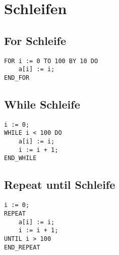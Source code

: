 


\section{Schleifen}
\subsection{For Schleife}
\begin{lstlisting}
FOR i := 0 TO 100 BY 10 DO
    a[i] := i;
END_FOR
\end{lstlisting}

\subsection{While Schleife}
\begin{lstlisting}
i := 0;
WHILE i < 100 DO
    a[i] := i;
    i := i + 1;
END_WHILE
\end{lstlisting}

\subsection{Repeat until Schleife}
\begin{lstlisting}
i := 0;
REPEAT
    a[i] := i;
    i := i + 1;
UNTIL i > 100
END_REPEAT
\end{lstlisting}
